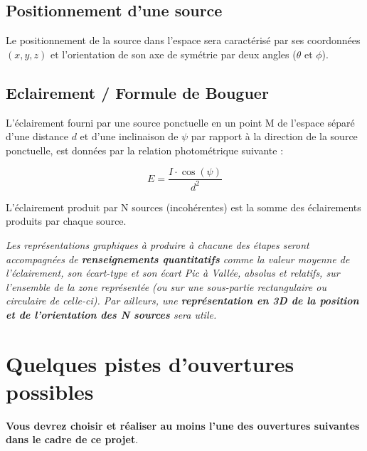 \medskip

\subsection{Positionnement d'une source}

Le positionnement de la source dans l'espace sera caractérisé par ses coordonnées $(x, y, z)$ et l'orientation de son axe de symétrie par deux angles ($\theta$ et $\phi$). 
	
\medskip

\subsection{Eclairement / Formule de Bouguer}

L'éclairement fourni par une source ponctuelle en un point M de l'espace séparé d'une distance $d$ et d'une inclinaison de $\psi$ par rapport à la direction de la source ponctuelle, est données par la relation photométrique suivante : 

$$E = \frac{I \cdot \cos(\psi)}{d^2}$$



L'éclairement produit par N sources (incohérentes) est la somme des éclairements produits par chaque source.

\medskip


\textit{Les représentations graphiques à produire à chacune des étapes seront accompagnées de \textbf{renseignements quantitatifs} comme la valeur moyenne de l'éclairement, son écart-type et son écart Pic à Vallée, absolus et relatifs, sur l'ensemble de la zone représentée (ou sur une sous-partie rectangulaire ou circulaire de celle-ci). Par ailleurs, une \textbf{représentation en 3D de la position et de l'orientation des N sources} sera utile.}


\section{Quelques pistes d'ouvertures possibles}

\textbf{Vous devrez choisir et réaliser au moins l'une des ouvertures suivantes dans le cadre de ce projet}.


